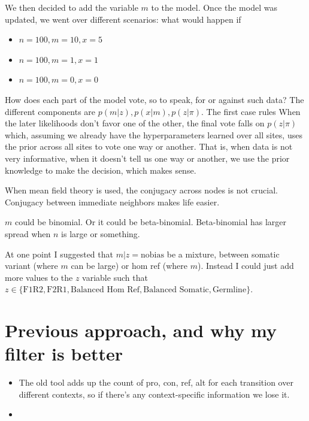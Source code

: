 \documentclass[a4paper]{article}
\begin{document}
We then decided to add the variable $m$ to the model.  Once the model was updated, we went over different scenarios: what would happen if 
\begin{itemize}
\item $n = 100, m = 10, x = 5$ 
\item $n = 100, m = 1, x = 1$
\item $n = 100, m = 0, x = 0$
\end{itemize}

How does each part of the model vote, so to speak, for or against such data? The different components are $p(m|z), p(x|m), p(z | \pi)$. The first case rules 
When the later likelihoods don't favor one of the other, the final vote falls on $p(z | \pi)$ which, assuming we already have the hyperparameters learned over all sites, uses the prior across all sites to vote one way or another. That is, when data is not very informative, when it doesn't tell us one way or another, we use the prior knowledge to make the decision, which makes sense.

When mean field theory is used, the conjugacy across nodes is not crucial. Conjugacy between immediate neighbors makes life easier.

$m$ could be binomial. Or it could be beta-binomial. Beta-binomial has larger spread when $n$ is large or something. 

At one point I suggested that $m|z = \mathrm{no bias}$ be a mixture, between somatic variant (where $m$ can be large) or hom ref (where $m$). Instead I could just add more values to the $z$ variable such that $z \in \{ \text{F1R2}, \text{F2R1}, \text{Balanced Hom Ref}, \text{Balanced Somatic}, \text{Germline} \}$.

\section{Previous approach, and why my filter is better}
\begin{itemize}
\item The old tool adds up the count of pro, con, ref, alt for each transition over different contexts, so if there's any context-specific information we lose it.
\item 
\end{itemize}
\end{document}
